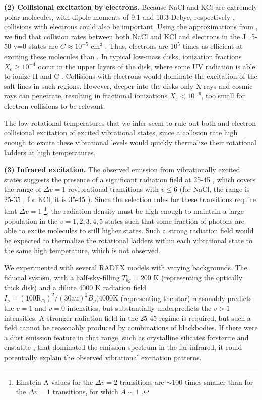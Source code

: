 \documentclass[twocolumn]{aastex62}
\begin{document}
\par{\textbf{(2) Collisional excitation by electrons.}} 
Because NaCl and KCl are extremely polar molecules, with dipole moments of 9.1
and 10.3 Debye, respectively \citep{Barton2014a}, collisions with electrons
could also be important.  Using the approximations from \citet{Dickinson1975a},
we find that collision rates between both NaCl and KCl and electrons in the
J=5-50 v=0 states are $C\approx10^{-5}$ cm$^{3}$ \pers.  Thus, electrons are
$10^5$ times as efficient at exciting these molecules than \hh. In typical
low-mass disks, ionization fractions $X_e \geq 10^{-4}$ occur in the upper
layers of the disk, where some UV radiation is able to ionize H and C
\citep{Bergin2007a}.  Collisions with electrons would dominate the excitation
of the salt lines in such regions.  However, deeper into the disks only X-rays
and cosmic rays can penetrate, resulting in fractional ionizations $X_e <
10^{-6}$, too small for electron collisions to be relevant. 

The low rotational temperatures that we infer seem to rule out both \hh and
electron collisional excitation of excited vibrational states, since a
collision rate high enough to excite these vibrational levels would quickly
thermalize their rotational ladders at high temperatures.


\par{\textbf{(3) Infrared excitation.}} 
The observed emission from vibrationally excited states suggests the
presence of a significant radiation field at 25-45 \um, which covers the range
of $\Delta v=1$ rovibrational transitions with $v\leq6$ (for NaCl, the range is
25-35 \um, for KCl, it is 35-45 \um).  Since the selection rules for these
transitions require that $\Delta v=1$ \footnote{Einstein A-values for the 
$\Delta v=2$ transitions are $\sim100$ times smaller than for the $\Delta v=1$
transitions, for which $A\sim1$ \pers.}, the radiation density must be high
enough to maintain a large population in the $v=1,
2, 3, 4, 5$ states such that some fraction of photons are able to excite
molecules to still higher states.  Such a strong radiation field would
be expected to thermalize the rotational ladders within each vibrational
state to the same high temperature, which is not observed.

We experimented with several RADEX models with varying backgrounds.  The
fiducial system, with a half-sky-filling $T_{bg}=200$ K (representing the
optically thick disk) and a dilute 4000 K radiation field $I_{\nu} = (100
\mathrm{R_\odot})^2 / (30 \mathrm{au})^2 B_\nu(4000 \mathrm{K}$ (representing
the star) reasonably predicts the $v=1$ and $v=0$ intensities, but
substantially underpredicts the $v>1$ intensities.  A stronger radiation
field in the 25-45 \um regime is required, but such a field cannot be
reasonably produced by combinations of blackbodies.  If there were a dust
emission feature in that range, such as crystalline silicates forsterite
and enstatite \citep[e.g.][]{Molster2005a}, that dominated the emission spectrum
in the far-infrared, it could potentially explain the observed vibrational
excitation patterns.
\end{document}
